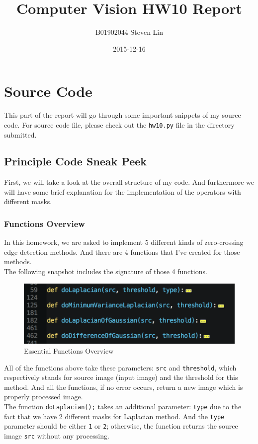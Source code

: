 \documentclass{article}
\title{Computer Vision HW10 Report}
\author{B01902044 Steven Lin}
\date{2015-12-16}
\newcommand{\code}[1]{\texttt{#1}}
\begin{document}
\maketitle
\newpage


\tableofcontents
\newpage

\section{Source Code}
This part of the report will go through some important snippets of my source code. For source code file, please check out the \code{hw10.py} file in the directory submitted.

\subsection{Principle Code Sneak Peek}
First, we will take a look at the overall structure of my code. And furthermore we will have some brief explanation for the implementation of the operators with different masks.

\subsubsection{Functions Overview}
In this homework, we are asked to implement 5 different kinds of zero-crossing edge detection methods. And there are 4 functions that I've created for those methods. \\
The following snapshot includes the signature of those 4 functions.\\
\begin{figure}[H]
  \includegraphics[width=\linewidth]{img/functions_overview.png}
  \caption{Essential Functions Overview}
  \label{fig:functions_overview}
\end{figure}
All of the functions above take these parameters: \code{src} and \code{threshold}, which respectively stands for source image (input image) and the threshold for this method. And all the functions, if no error occurs, return a new image which is properly processed image. \\
The function \code{doLaplacian();} takes an additional parameter: \code{type} due to the fact that we have 2 different masks for Laplacian method. And the \code{type} parameter should be either \code{1} or \code{2}; otherwise, the function returns the source image \code{src} without any processing.
\end{document}
